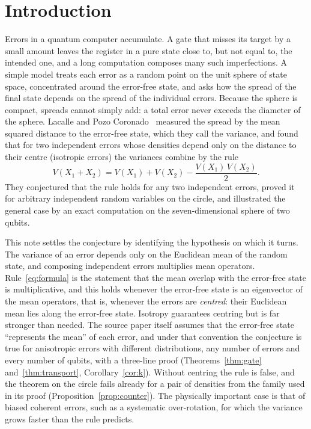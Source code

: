 \documentclass[11pt,a4paper]{article}
\theoremstyle{definition}
\theoremstyle{plain}
\begin{document}
\section{Introduction}
Errors in a quantum computer accumulate. A gate that misses its target by a
small amount leaves the register in a pure state close to, but not equal to,
the intended one, and a long computation composes many such imperfections.
A simple model treats each error as a random point on the unit sphere of
state space, concentrated around the error-free state, and asks how the
spread of the final state depends on the spread of the individual errors.
Because the sphere is compact, spreads cannot simply add: a total error never
exceeds the diameter of the sphere. Lacalle and Pozo
Coronado~\cite{LacallePozo2019} measured the spread by the mean squared
distance to the error-free state, which they call the variance, and found that
for two independent errors whose densities depend only on the distance to
their centre (isotropic errors) the variances combine by the rule
\begin{equation}\label{eq:formula}
V(X_1+X_2)=V(X_1)+V(X_2)-\frac{V(X_1)\,V(X_2)}{2}.
\end{equation}
They conjectured that the rule holds for any two independent errors, proved it
for arbitrary independent random variables on the circle, and illustrated the
general case by an exact computation on the seven-dimensional sphere of two
qubits.

This note settles the conjecture by identifying the hypothesis on which it
turns. The variance of an error depends only on the Euclidean mean of the
random state, and composing independent errors multiplies mean operators.
Rule~\eqref{eq:formula} is the statement that the mean overlap with the
error-free state is multiplicative, and this holds whenever the error-free
state is an eigenvector of the mean operators, that is, whenever the errors
are \emph{centred}: their Euclidean mean lies along the error-free state.
Isotropy guarantees centring but is far stronger than needed. The source paper
itself assumes that the error-free state ``represents the mean'' of each
error, and under that convention the conjecture is true for anisotropic errors
with different distributions, any number of errors and every number of
qubits, with a three-line proof (Theorems~\ref{thm:gate}
and~\ref{thm:transport}, Corollary~\ref{cor:k}). Without centring the rule is
false, and the theorem on the circle fails already for a pair of densities
from the family used in its proof (Proposition~\ref{prop:counter}). The
physically important case is that of biased coherent errors, such as a
systematic over-rotation, for which the variance grows faster than the rule
predicts.
\end{document}
